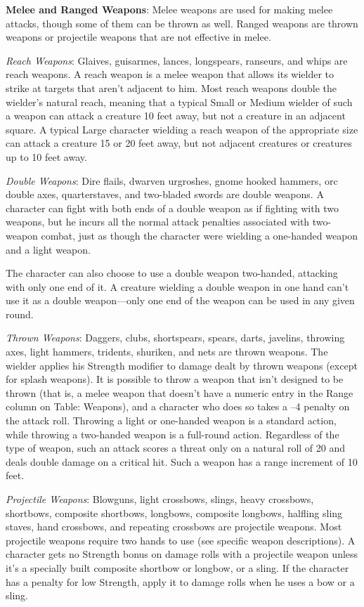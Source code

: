 \textbf{Melee and Ranged Weapons}: Melee weapons are used for making melee attacks, though some of them can be thrown as well. Ranged weapons are thrown weapons or projectile weapons that are not effective in melee.
		
\textit{Reach Weapons}: Glaives, guisarmes, lances, longspears, ranseurs, and whips are reach weapons. A reach weapon is a melee weapon that allows its wielder to strike at targets that aren't adjacent to him. Most reach weapons double the wielder's natural reach, meaning that a typical Small or Medium wielder of such a weapon can attack a creature 10 feet away, but not a creature in an adjacent square. A typical Large character wielding a reach weapon of the appropriate size can attack a creature 15 or 20 feet away, but not adjacent creatures or creatures up to 10 feet away.
		
\textit{Double Weapons}: Dire flails, dwarven urgroshes, gnome hooked hammers, orc double axes, quarterstaves, and two-bladed swords are double weapons. A character can fight with both ends of a double weapon as if fighting with two weapons, but he incurs all the normal attack penalties associated with two-weapon combat, just as though the character were wielding a one-handed weapon and a light weapon.
		
The character can also choose to use a double weapon two-handed, attacking with only one end of it. A creature wielding a double weapon in one hand can't use it as a double weapon---only one end of the weapon can be used in any given round.
		
\textit{Thrown Weapons}: Daggers, clubs, shortspears, spears, darts, javelins, throwing axes, light hammers, tridents, shuriken, and nets are thrown weapons. The wielder applies his Strength modifier to damage dealt by thrown weapons (except for splash weapons). It is possible to throw a weapon that isn't designed to be thrown (that is, a melee weapon that doesn't have a numeric entry in the Range column on Table: Weapons), and a character who does so takes a --4 penalty on the attack roll. Throwing a light or one-handed weapon is a standard action, while throwing a two-handed weapon is a full-round action. Regardless of the type of weapon, such an attack scores a threat only on a natural roll of 20 and deals double damage on a critical hit. Such a weapon has a range increment of 10 feet.
		
\textit{Projectile Weapons}: Blowguns, light crossbows, slings, heavy crossbows, shortbows, composite shortbows, longbows, composite longbows, halfling sling staves, hand crossbows, and repeating crossbows are projectile weapons. Most projectile weapons require two hands to use (see specific weapon descriptions). A character gets no Strength bonus on damage rolls with a projectile weapon unless it's a specially built composite shortbow or longbow, or a sling. If the character has a penalty for low Strength, apply it to damage rolls when he uses a bow or a sling.
		
